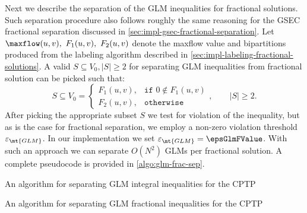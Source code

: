 Next we describe the separation of the GLM inequalities for fractional solutions.
Such separation procedure also follows roughly the same reasoning
for the GSEC fractional separation discussed in \cref{sec:impl-gsec-fractional-separation}.
Let $\maxflow(u, v),\ F_1(u, v),\ F_2(u, v)$ denote the maxflow value and bipartitions
produced from the labeling algorithm described in \cref{sec:impl-labeling-fractional-solutions}.
A valid $S \subseteq V_0, |S| \ge 2$ for separating GLM inequalities
from fractional solution can be picked such that:
\begin{equation}
	S \subseteq V_0 =
	\begin{cases}
		F_1(u, v), & \texttt{if } 0 \notin F_1(u, v) \\
		F_2(u, v), & \texttt{otherwise}
	\end{cases},
	\qquad
	|S| \ge 2.
\end{equation}
After picking the appropriate subset $S$ we test for violation of the inequality,
but as is the case for fractional separation,
we employ a non-zero violation threshold $\varepsilon_{\mt{GLM}}$.
In our implementation we set $\varepsilon_{\mt{GLM}} = \epsGlmFValue$.
With such an approach we can separate $O(N^2)$ GLMs per fractional solution.
A complete pseudocode is provided in \cref{algo:glm-frac-sep}.

\begin{algorithm}
	\caption{An algorithm for separating GLM integral inequalities for the CPTP}
	\label{algo:glm-integral-sep}
	
\end{algorithm}

\begin{algorithm}
	\caption{An algorithm for separating GLM fractional inequalities for the CPTP}
	\label{algo:glm-frac-sep}
	
\end{algorithm}

